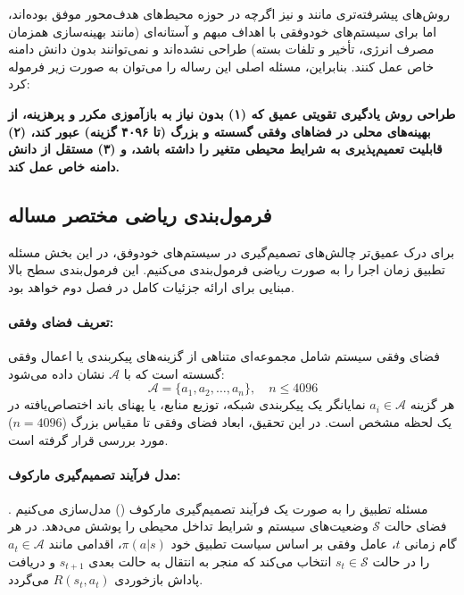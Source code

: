 \documentclass[oneside,openany,phd]{TMU-Thesis}
\begin{document}
روش‌های پیشرفته‌تری مانند  \cite{andrychowicz2017her} و  \cite{he2020softher} نیز اگرچه در حوزه محیط‌های هدف‌محور موفق بوده‌اند، اما برای سیستم‌های خودوفقی با اهداف مبهم و آستانه‌ای (مانند بهینه‌سازی همزمان مصرف انرژی، تأخیر و تلفات بسته) طراحی نشده‌اند و نمی‌توانند بدون دانش دامنه خاص عمل کنند. بنابراین، مسئله اصلی این رساله را می‌توان به صورت زیر فرموله کرد:

\begin{center}
\textbf{طراحی روش یادگیری تقویتی عمیق که (۱) بدون نیاز به بازآموزی مکرر و پرهزینه، از بهینه‌های محلی در فضاهای وفقی گسسته و بزرگ (تا ۴۰۹۶ گزینه) عبور کند، (۲) قابلیت تعمیم‌پذیری به شرایط محیطی متغیر را داشته باشد، و (۳) مستقل از دانش دامنه خاص عمل کند.}
\end{center}

\subsection*{فرمول‌بندی ریاضی مختصر مساله}

برای درک عمیق‌تر چالش‌های تصمیم‌گیری در سیستم‌های خودوفق، در این بخش مسئله تطبیق زمان اجرا را به صورت ریاضی فرمول‌بندی می‌کنیم. این فرمول‌بندی سطح بالا مبنایی برای ارائه جزئیات کامل در فصل دوم خواهد بود.

\paragraph{تعریف فضای وفقی:}
فضای وفقی سیستم شامل مجموعه‌ای متناهی از گزینه‌های پیکربندی یا اعمال وفقی گسسته است که با $\mathcal{A}$ نشان داده می‌شود:
\begin{equation}
\mathcal{A} = \{a_1, a_2, \ldots, a_n\}, \quad n \leq 4096
\end{equation}
هر گزینه $a_i \in \mathcal{A}$ نمایانگر یک پیکربندی شبکه، توزیع منابع، یا پهنای باند اختصاص‌یافته در یک لحظه مشخص است. در این تحقیق، ابعاد فضای وفقی تا مقیاس بزرگ ($n=4096$) مورد بررسی قرار گرفته است.

\paragraph{مدل فرآیند تصمیم‌گیری مارکوف:}
مسئله تطبیق را به صورت یک فرآیند تصمیم‌گیری مارکوف () مدل‌سازی می‌کنیم \cite{puterman1994markov, sutton2018reinforcement}. فضای حالت $\mathcal{S}$ وضعیت‌های سیستم و شرایط تداخل محیطی را پوشش می‌دهد. در هر گام زمانی $t$، عامل وفقی بر اساس سیاست تطبیق خود $\pi(a|s)$، اقدامی مانند $a_t \in \mathcal{A}$ را در حالت $s_t \in \mathcal{S}$ انتخاب می‌کند که منجر به انتقال به حالت بعدی $s_{t+1}$ و دریافت پاداش بازخوردی $R(s_t, a_t)$ می‌گردد.
\end{document}
